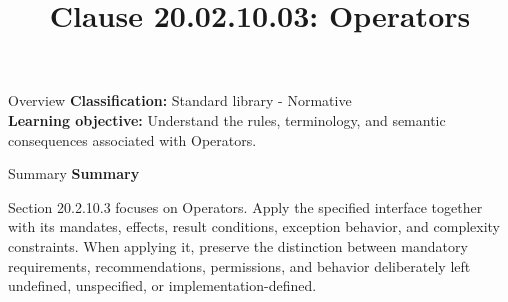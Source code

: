 \documentclass[10pt,letterpaper]{article}
\title{Clause 20.02.10.03: Operators}
\author{}
\date{}
\begin{document}
\maketitle
\begin{CornellOverviewBox}{Overview}
\textbf{Classification:} Standard library - Normative\\[2pt]
\textbf{Learning objective:} Understand the rules, terminology, and semantic consequences associated with Operators.
\end{CornellOverviewBox}\begin{CornellSummaryBox}{Summary}
{\sffamily\bfseries\color{Accent} Summary}\par\vspace{3pt}Section 20.2.10.3 focuses on Operators. Apply the specified interface together with its mandates, effects, result conditions, exception behavior, and complexity constraints. When applying it, preserve the distinction between mandatory requirements, recommendations, permissions, and behavior deliberately left undefined, unspecified, or implementation-defined.
\end{CornellSummaryBox}
\end{document}
